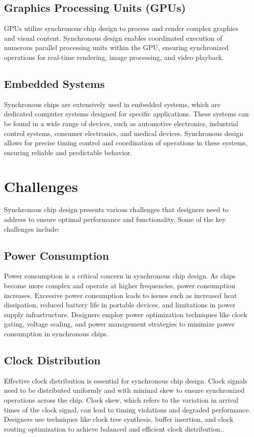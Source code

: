 \documentclass[a4paper,11pt]{report}
\begin{document}
\section{Graphics Processing Units (GPUs)}
GPUs utilize synchronous chip design to process and render complex graphics and visual content. Synchronous design enables coordinated execution of numerous parallel processing units within the GPU, ensuring synchronized operations for real-time rendering, image processing, and video playback.

\section{Embedded Systems}
Synchronous chips are extensively used in embedded systems, which are dedicated computer systems designed for specific applications. These systems can be found in a wide range of devices, such as automotive electronics, industrial control systems, consumer electronics, and medical devices. Synchronous design allows for precise timing control and coordination of operations in these systems, ensuring reliable and predictable behavior.

\chapter{Challenges}

Synchronous chip design presents various challenges that designers need to address to ensure optimal performance and functionality. Some of the key challenges include:

\section{Power Consumption}
Power consumption is a critical concern in synchronous chip design. As chips become more complex and operate at higher frequencies, power consumption increases. Excessive power consumption leads to issues such as increased heat dissipation, reduced battery life in portable devices, and limitations in power supply infrastructure. Designers employ power optimization techniques like clock gating, voltage scaling, and power management strategies to minimize power consumption in synchronous chips.

\section{Clock Distribution}
Effective clock distribution is essential for synchronous chip design. Clock signals need to be distributed uniformly and with minimal skew to ensure synchronized operations across the chip. Clock skew, which refers to the variation in arrival times of the clock signal, can lead to timing violations and degraded performance. Designers use techniques like clock tree synthesis, buffer insertion, and clock routing optimization to achieve balanced and efficient clock distribution..
\end{document}
